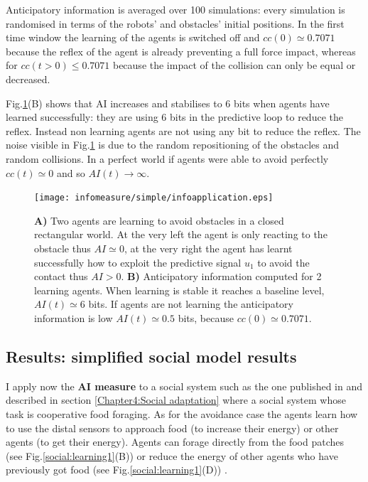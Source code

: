 Anticipatory information is averaged over 100 simulations:
every simulation is randomised in terms of the robots' and obstacles' initial positions.
In the first time window the learning of the agents is switched off and $cc(0)\simeq 0.7071$
because the reflex of the agent is already preventing a full force impact, whereas for
$cc(t>0) \leq 0.7071$ because the impact of the collision can only be equal or decreased.

Fig.\ref{avoidance:resume}(B) shows that AI increases and stabilises to 6 bits when agents
have learned successfully: they are using 6 bits in the predictive loop to reduce the reflex.
Instead non learning agents are not using any bit to reduce the reflex.
The noise visible in Fig.\ref{avoidance:resume} is due to the random repositioning of the
obstacles and random collisions. In a perfect world if agents were able to avoid
perfectly $cc(t)\simeq 0$ and so $AI(t)\rightarrow \infty$.

\begin{figure}[htbp]
\begin{center}
\texttt{[image: infomeasure/simple/infoapplication.eps]}
\end{center}
\caption[Max correlation application to a simplified case]{
\textbf{A)} Two agents are learning to avoid obstacles in a closed rectangular world.
At the very left the agent is only reacting to the obstacle thus $AI\simeq0$,
at the very right the agent has learnt successfully how to exploit the predictive
signal $u_1$ to avoid the contact thus $AI > 0$. 
\textbf{B)}  Anticipatory information computed for 2 learning agents.
When learning is stable it reaches a baseline level, $AI(t)\simeq 6$ bits.
If agents are not learning the anticipatory information is low $AI(t)\simeq 0.5$
bits, because $cc(0)\simeq 0.7071$. \label{avoidance:resume}}
\end{figure}

\subsection{Results: simplified social model results}
I apply now the \textbf{AI measure} to a social system such as the one published
in \citet{DiProdiMultiAgent} and described in section \ref{Chapter4:Social adaptation}
where a social system whose task is cooperative food foraging.
As for the avoidance case the agents learn how to use the distal sensors to
approach food (to increase their energy) or other agents (to get their energy).
Agents can forage directly from the food patches (see Fig.\ref{social:learning1}(B))
or reduce the energy of other agents who have previously got food (see Fig.\ref{social:learning1}(D)) .

